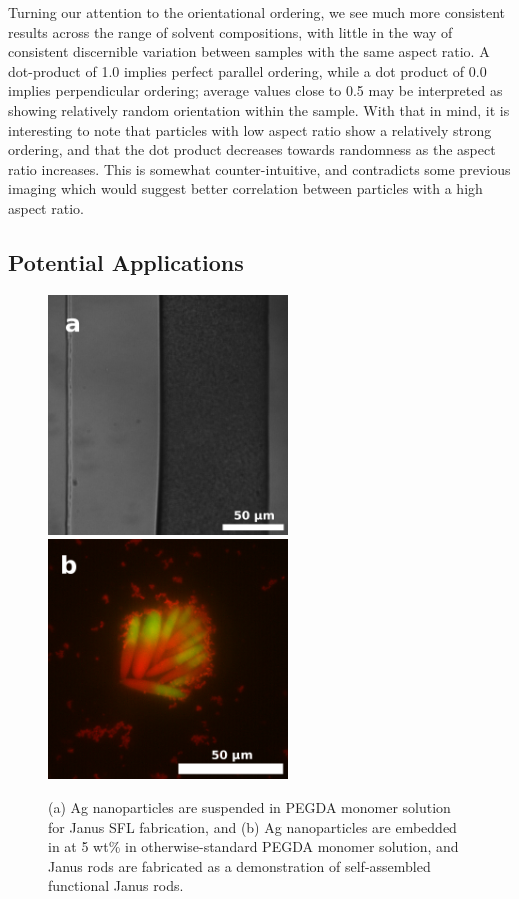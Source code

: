Turning our attention to the orientational ordering, we see much more consistent results across the
range of solvent compositions, with little in the way of consistent discernible variation between samples with
the same aspect ratio.  A dot-product of 1.0 implies perfect parallel ordering, while a dot product of 0.0 implies
perpendicular ordering; average values close to 0.5 may be interpreted as showing relatively random orientation
within the sample.  With that in mind, it is interesting to note that particles with low aspect ratio show 
a relatively strong ordering, and that the dot product decreases towards randomness as the aspect ratio 
increases.  This is somewhat counter-intuitive, and contradicts some previous imaging which would suggest
better correlation between particles with a high aspect ratio.

\subsection{Potential Applications}

\begin{figure}
\begin{center}

\includegraphics[height=2.5in]{figures/rods/silver-microchannel-twostream.png}
\includegraphics[height=2.5in]{figures/rods/silver-fluorescence-assembly.png}
\end{center}
\caption{
(a) Ag nanoparticles are suspended in PEGDA monomer solution for Janus SFL fabrication, and
(b) Ag nanoparticles are embedded in at 5 wt\% in otherwise-standard PEGDA monomer solution, and Janus rods
are fabricated as a demonstration of self-assembled functional Janus rods.}
\label{fig:silver-janus}
\end{figure}

